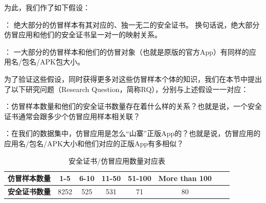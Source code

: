 为此，我们作了如下假设：

\vspace{5mm}
： 绝大部分的仿冒样本有其对应的、独一无二的安全证书。
换句话说，绝大部分仿冒应用和他们的安全证书呈一对一的映射关系。

： 一大部分的仿冒样本和他们的仿冒对象（也就是原版的官方App）有同样的应用名/包名/APK包大小。
\vspace{5mm}

为了验证这些假设，同时获得更多对这些仿冒样本个体的知识，我们在本节中提出了以下研究问题（Research Question，简称RQ），分别与上述假设一一对应：

\vspace{5mm}
：仿冒样本数量和他们的安全证书数量存在着什么样的关系？也就是说，一个安全证书通常会跟多少个仿冒应用样本相关联？

：在我们的数据集中，仿冒应用是怎么``山寨''正版App的？也就是说，仿冒应用的应用名/包名/APK大小和他们对应的正版App有多相似？
\vspace{5mm}

\begin{table}[htbp]
  \renewcommand{\arraystretch}{1}
  \footnotesize
  \centering
  \caption{安全证书/仿冒应用数量对应表}
  \vspace{1mm}
  \begin{tabular}{l c c c c c c c}
  \toprule
  {\bf 仿冒样本数量} & {\bf 1-5} & {\bf 6-10} & {\bf 11-50} & {\bf 51-100} & {\bf More than 100} \\
  \midrule
  {\bf 安全证书数量} & 8252 & 525 & 531 & 71 & 80 \\
  \bottomrule
  \end{tabular}
  \label{table:certificate_number_statistic}
\end{table}

